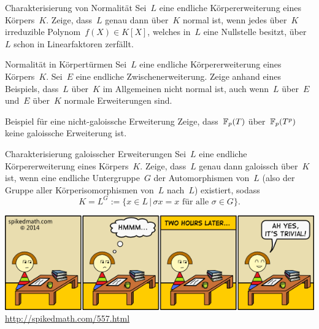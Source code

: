 \documentclass{algblatt}
\begin{document}

\begin{aufgabe}{4}{Charakterisierung von Normalität}
Sei~$L$ eine endliche Körpererweiterung eines Körpers~$K$. Zeige, dass~$L$
genau dann über~$K$ normal ist, wenn jedes über~$K$ irreduzible Polynom~$f(X)
\in K[X]$, welches in~$L$ eine Nullstelle besitzt, über~$L$ schon in
Linearfaktoren zerfällt.
\end{aufgabe}

\begin{aufgabe}{4}{Normalität in Körpertürmen}
Sei~$L$ eine endliche Körpererweiterung eines Körpers~$K$. Sei~$E$ eine
endliche Zwischenerweiterung. Zeige anhand eines Beispiels, dass~$L$ über~$K$
im Allgemeinen nicht normal ist, auch wenn~$L$ über~$E$ und~$E$ über~$K$
normale Erweiterungen sind.
\end{aufgabe}

\begin{aufgabe}{4}{Beispiel für eine nicht-galoissche Erweiterung}
Zeige, dass~$\mathbb{F}_p(T)$ über~$\mathbb{F}_p(T^p)$ keine galoissche Erweiterung ist.
\end{aufgabe}

\begin{aufgabe}{4}{Charakterisierung galoisscher Erweiterungen}
Sei~$L$ eine endliche Körpererweiterung eines Körpers~$K$. Zeige, dass~$L$
genau dann galoissch über~$K$ ist, wenn eine endliche Untergruppe~$G$ der
Automorphismen von~$L$ (also der Gruppe aller Körperisomorphismen von~$L$
nach~$L$) existiert, sodass
\[ K = L^G := \{ x \in L \,|\, \text{$\sigma x = x$ für alle $\sigma \in G$}
\}. \]
\end{aufgabe}

\begin{center}
  \includegraphics[scale=0.7]{trivial}
  \small \url{http://spikedmath.com/557.html}
\end{center}
\end{document}
